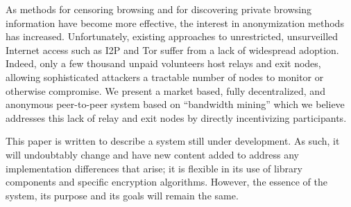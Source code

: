 
\noindent
As methods for censoring browsing and for discovering private browsing information have become more effective, the interest in anonymization methods has increased. Unfortunately, existing approaches to unrestricted, unsurveilled Internet access such as I2P and Tor suffer from a lack of widespread adoption.  Indeed,  only a few thousand unpaid volunteers host relays and exit nodes, allowing sophisticated attackers a tractable number of nodes to monitor or otherwise compromise. We present a market based, fully decentralized, and anonymous peer-to-peer system based on “bandwidth mining” which we believe addresses this lack of relay and exit nodes by directly incentivizing participants.

\smallskip
\noindent
This paper is written to describe a system still under development. As such, it will undoubtably change and have new content added to address any implementation differences that arise; it is flexible in its use of library components and specific encryption algorithms. However, the essence of the system, its purpose and its goals will remain the same.

